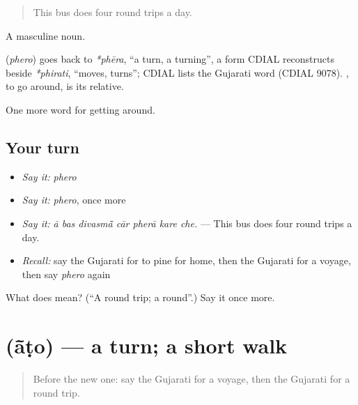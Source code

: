 \begin{quote}
This bus does four round trips a day.
\end{quote}

A masculine noun.

\begin{cousinweb}
\textbf{} (\emph{phero}) goes back to \emph{*phēra}, \textquotedblleft{}a turn, a turning\textquotedblright{}, a form CDIAL reconstructs beside \emph{*phirati}, \textquotedblleft{}moves, turns\textquotedblright{}; CDIAL lists the Gujarati word (CDIAL 9078). , to go around, is its relative.
\end{cousinweb}

\begin{grammarlens}[title={What you've built}]
One more word for getting around.
\end{grammarlens}

\subsection*{Your turn}
\begin{itemize}
\raggedright
  \item \emph{Say it:} \emph{phero}
  \item \emph{Say it:} \emph{phero}, once more
  \item \emph{Say it:} \emph{ā bas divasmā̃ cār pherā kare che.} — This bus does four round trips a day.
  \item \emph{Recall:} say the Gujarati for to pine for home, then the Gujarati for a voyage, then say \emph{phero} again
\end{itemize}

\begin{tcolorbox}[breakable,colback=teal!4,colframe=teal!35!black,title={Before you move on}]
What does  mean? (\textquotedblleft{}A round trip; a round\textquotedblright{}.) Say it once more.
\end{tcolorbox}
\section[\texorpdfstring{\gu{આંટો} (ā̃ṭo)}{આંટો (ā̃ṭo)}]{ (ā̃ṭo) — a turn; a short walk}

\label{lesson:GU-C408-ato}



\begin{quote}
Before the new one: say the Gujarati for a voyage, then the Gujarati for a round trip.
\end{quote}

